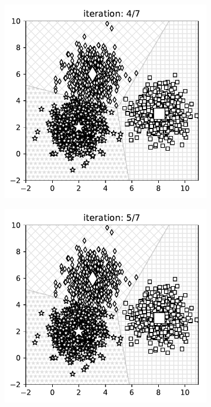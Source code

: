 \begin{figure}[t]
\begin{subfigure}{0.325\textwidth}
\includegraphics[width=0.99\linewidth]{ebookML_src/src/kmeans/ex_3.pdf}
\end{subfigure}
\begin{subfigure}{0.325\textwidth}
\includegraphics[width=0.99\linewidth]{ebookML_src/src/kmeans/ex_4.pdf}

\end{subfigure}
\end{figure}

